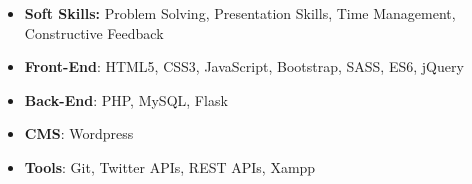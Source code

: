 

\begin{cvparagraph}

\begin{custom1}
\begin{itemize}
    \item \textbf{Soft Skills:} Problem Solving, Presentation Skills, Time Management, Constructive Feedback
    
    \item \textbf{Front-End}: HTML5, CSS3, JavaScript, Bootstrap, SASS, ES6, jQuery
    
    \item \textbf{Back-End}: PHP, MySQL, Flask
    
    \item \textbf{CMS}: Wordpress
    
    \item \textbf{Tools}: Git, Twitter APIs, REST APIs, Xampp
\end{itemize}
\end{custom1}

\end{cvparagraph}
